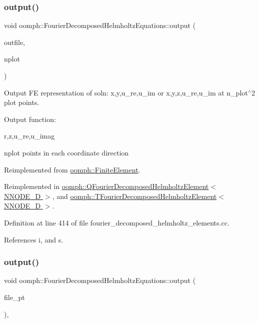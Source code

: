 \subsubsection{\texorpdfstring{output()}{output()}\hspace{0.1cm}{\footnotesize\ttfamily [2/4]}}
{\footnotesize\ttfamily void oomph\+::\+Fourier\+Decomposed\+Helmholtz\+Equations\+::output (\begin{DoxyParamCaption}\item[{std\+::ostream \&}]{outfile,  }\item[{const unsigned \&}]{nplot }\end{DoxyParamCaption})\hspace{0.3cm}{\ttfamily [virtual]}}



Output FE representation of soln\+: x,y,u\+\_\+re,u\+\_\+im or x,y,z,u\+\_\+re,u\+\_\+im at n\+\_\+plot$^\wedge$2 plot points. 

Output function\+:

r,z,u\+\_\+re,u\+\_\+imag

nplot points in each coordinate direction 

Reimplemented from \hyperlink{classoomph_1_1FiniteElement_afa9d9b2670f999b43e6679c9dd28c457}{oomph\+::\+Finite\+Element}.



Reimplemented in \hyperlink{classoomph_1_1QFourierDecomposedHelmholtzElement_aa14e9dc5f9773a5b043ea7873a7b9790}{oomph\+::\+Q\+Fourier\+Decomposed\+Helmholtz\+Element$<$ N\+N\+O\+D\+E\+\_\+D $>$}, and \hyperlink{classoomph_1_1TFourierDecomposedHelmholtzElement_a1ee5d590a4d0bcd09e88a4016834a83f}{oomph\+::\+T\+Fourier\+Decomposed\+Helmholtz\+Element$<$ N\+N\+O\+D\+E\+\_\+D $>$}.



Definition at line 414 of file fourier\+\_\+decomposed\+\_\+helmholtz\+\_\+elements.\+cc.



References i, and s.

\mbox{\label{classoomph_1_1FourierDecomposedHelmholtzEquations_af4d25af42bb3ccacd49e12b93bb38953}} 
\subsubsection{\texorpdfstring{output()}{output()}\hspace{0.1cm}{\footnotesize\ttfamily [3/4]}}
{\footnotesize\ttfamily void oomph\+::\+Fourier\+Decomposed\+Helmholtz\+Equations\+::output (\begin{DoxyParamCaption}\item[{F\+I\+LE $\ast$}]{file\+\_\+pt }\end{DoxyParamCaption})\hspace{0.3cm}{\ttfamily [inline]}, {\ttfamily [virtual]}}



